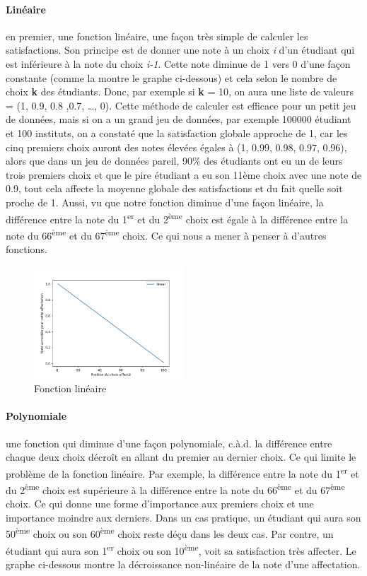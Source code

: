 \documentclass[12pt,titlepage]{article}
\begin{document}
\paragraph{Linéaire} en premier, une fonction linéaire, une façon très simple de calculer les satisfactions. Son principe est de donner une note à un choix \textit{i} d'un étudiant qui est inférieure à la note du choix \textit{i-1}. Cette note diminue de 1 vers 0 d'une façon constante (comme la montre le graphe ci-dessous) et cela selon le nombre de choix \textbf{k} des étudiants. Donc, par exemple si \textbf{k} = 10, on aura une liste de valeurs = (1, 0.9, 0.8 ,0.7, \dots, 0).
Cette méthode de calculer est efficace pour un petit jeu de données, mais si on a un grand jeu de données, par exemple 100000 étudiant et 100 instituts, on a constaté que la satisfaction globale approche de 1, car les cinq premiers choix auront des notes élevées égales à (1, 0.99, 0.98, 0.97, 0.96), alors que dans un jeu de données pareil, 90\% des étudiants ont eu un de leurs trois premiers choix et que le pire étudiant a eu son 11ème choix avec une note de 0.9, tout cela affecte la moyenne globale des satisfactions et du fait quelle soit proche de 1. Aussi, vu que notre fonction diminue d'une façon linéaire, la différence entre la note du 1\textsuperscript{er} et du 2\textsuperscript{ème} choix est égale à la différence entre la note du 66\textsuperscript{ème} et du 67\textsuperscript{ème} choix. Ce qui nous a mener à penser à d'autres fonctions.

\begin{figure}[!h]
\centering
\includegraphics[width = 0.5\textwidth]{img/linear.png}
\caption{Fonction linéaire}
\end{figure}

\paragraph{Polynomiale} une fonction qui diminue d'une façon polynomiale, c.à.d. la différence entre chaque deux choix décroît en allant du premier au dernier choix. Ce qui limite le problème de la fonction linéaire. Par exemple, la différence entre la note du 1\textsuperscript{er} et du 2\textsuperscript{ème} choix est supérieure à la différence entre la note du 66\textsuperscript{ème} et du 67\textsuperscript{ème} choix. Ce qui donne une forme d'importance aux premiers choix et une importance moindre aux derniers. Dans un cas pratique, un étudiant qui aura son 50\textsuperscript{ème} choix ou son 60\textsuperscript{ème} choix reste déçu dans les deux cas. Par contre, un étudiant qui aura son 1\textsuperscript{er} choix ou son 10\textsuperscript{ème}, voit sa satisfaction très affecter. Le graphe ci-dessous montre la décroissance non-linéaire de la note d'une affectation.
\end{document}
